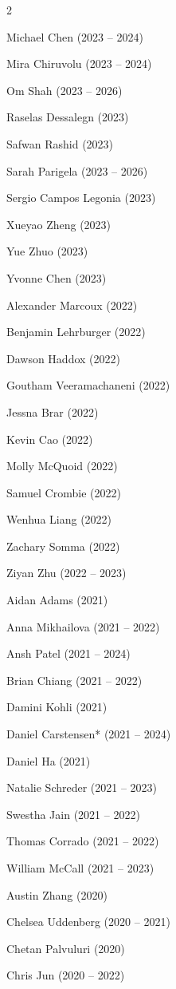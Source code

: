 \documentclass[11pt, a4paper]{article} %
\begin{document}
\begin{multicols}{2}
\begin{etaremune}
  \item Michael Chen (2023 -- 2024)
  \item Mira Chiruvolu (2023 -- 2024)
  \item Om Shah (2023 -- 2026)
  \item Raselas Dessalegn (2023)
  \item Safwan Rashid (2023)
  \item Sarah Parigela (2023 -- 2026)
  \item Sergio Campos Legonia (2023)
  \item Xueyao Zheng (2023)
  \item Yue Zhuo (2023)
  \item Yvonne Chen (2023)
  \item Alexander Marcoux (2022)
  \item Benjamin Lehrburger (2022)
  \item Dawson Haddox (2022)
  \item Goutham Veeramachaneni (2022)
  \item Jessna Brar (2022)
  \item Kevin Cao (2022)
  \item Molly McQuoid (2022)
  \item Samuel Crombie (2022)
  \item Wenhua Liang (2022)
  \item Zachary Somma (2022)
  \item Ziyan Zhu (2022 -- 2023)
  \item Aidan Adams (2021)
  \item Anna Mikhailova (2021 -- 2022)
  \item Ansh Patel (2021 -- 2024)
  \item Brian Chiang (2021 -- 2022)
  \item Damini Kohli (2021)
  \item Daniel Carstensen* (2021 -- 2024)
  \item Daniel Ha (2021)
  \item Natalie Schreder (2021 -- 2023)
  \item Swestha Jain (2021 -- 2022)
  \item Thomas Corrado (2021 -- 2022)
  \item William McCall (2021 -- 2023)
  \item Austin Zhang (2020)
  \item Chelsea Uddenberg (2020 -- 2021)
  \item Chetan Palvuluri (2020)
  \item Chris Jun (2020 -- 2022)

\end{etaremune}
\end{multicols}
\end{document}
